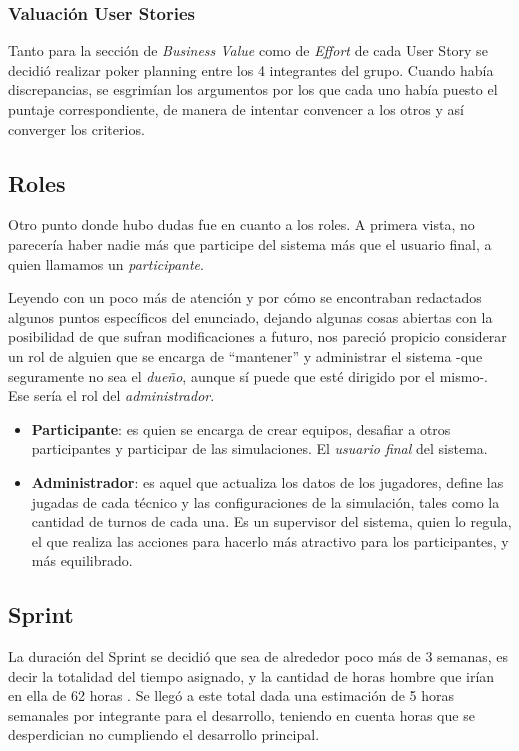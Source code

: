 \subsubsection*{Valuación User Stories}
Tanto para la sección de \emph{Business Value} como de \emph{Effort} de cada User Story se decidió realizar poker planning entre los 4 integrantes del grupo. Cuando había discrepancias, se esgrimían los argumentos por los que cada uno había puesto el puntaje correspondiente, de manera de intentar convencer a los otros y así converger los criterios.

\subsection*{Roles}
Otro punto donde hubo dudas fue en cuanto a los roles. A primera vista, no parecería haber nadie más que participe del sistema más que el usuario final, a quien llamamos un \emph{participante}. 

Leyendo con un poco más de atención y por cómo se encontraban redactados algunos puntos específicos del enunciado, dejando algunas cosas abiertas con la posibilidad de que sufran modificaciones a futuro, nos pareció propicio considerar un rol de alguien que se encarga de ``mantener'' y administrar el sistema -que seguramente no sea el \emph{dueño}, aunque sí puede que esté dirigido por el mismo-. Ese sería el rol del \emph{administrador}.
\begin{itemize}
\item \textbf{Participante}: es quien se encarga de crear equipos, desafiar a otros participantes y participar de las simulaciones. El \textit{usuario final} del sistema.
\item \textbf{Administrador}: es aquel que actualiza los datos de los jugadores, define las jugadas de cada técnico y las configuraciones de la simulación, tales como la cantidad de turnos de cada una. Es un supervisor del sistema, quien lo regula, el que realiza las acciones para hacerlo más atractivo para los participantes, y más equilibrado.
\end{itemize}

\subsection{Sprint}
La duración del Sprint se decidió que sea de alrededor poco más de 3 semanas, es decir la totalidad del tiempo asignado, y la cantidad de horas hombre que irían en ella de 62 horas . Se llegó a este total dada una estimación de 5 horas semanales por integrante para el desarrollo, teniendo en cuenta horas que se desperdician no cumpliendo el desarrollo principal.\\


